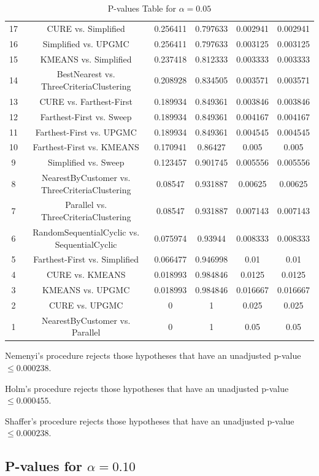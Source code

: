\documentclass[a4paper,10pt]{article}
\begin{document}
\begin{landscape}
\begin{table}[!htp]
\begin{tabular}{cccccc}
17&CURE vs. Simplified&0.256411&0.797633&0.002941&0.002941\\
16&Simplified vs. UPGMC&0.256411&0.797633&0.003125&0.003125\\
15&KMEANS vs. Simplified&0.237418&0.812333&0.003333&0.003333\\
14&BestNearest vs. ThreeCriteriaClustering&0.208928&0.834505&0.003571&0.003571\\
13&CURE vs. Farthest-First&0.189934&0.849361&0.003846&0.003846\\
12&Farthest-First vs. Sweep&0.189934&0.849361&0.004167&0.004167\\
11&Farthest-First vs. UPGMC&0.189934&0.849361&0.004545&0.004545\\
10&Farthest-First vs. KMEANS&0.170941&0.86427&0.005&0.005\\
9&Simplified vs. Sweep&0.123457&0.901745&0.005556&0.005556\\
8&NearestByCustomer vs. ThreeCriteriaClustering&0.08547&0.931887&0.00625&0.00625\\
7&Parallel vs. ThreeCriteriaClustering&0.08547&0.931887&0.007143&0.007143\\
6&RandomSequentialCyclic vs. SequentialCyclic&0.075974&0.93944&0.008333&0.008333\\
5&Farthest-First vs. Simplified&0.066477&0.946998&0.01&0.01\\
4&CURE vs. KMEANS&0.018993&0.984846&0.0125&0.0125\\
3&KMEANS vs. UPGMC&0.018993&0.984846&0.016667&0.016667\\
2&CURE vs. UPGMC&0&1&0.025&0.025\\
1&NearestByCustomer vs. Parallel&0&1&0.05&0.05\\
\hline
\end{tabular}
\caption{P-values Table for $\alpha=0.05$}
\end{table}Nemenyi's procedure rejects those hypotheses that have an unadjusted p-value $\le0.000238$.

Holm's procedure rejects those hypotheses that have an unadjusted p-value $\le0.000455$.

Shaffer's procedure rejects those hypotheses that have an unadjusted p-value $\le0.000238$.

\pagebreak

\subsection{P-values for $\alpha=0.10$}


\end{landscape}
\end{document}
